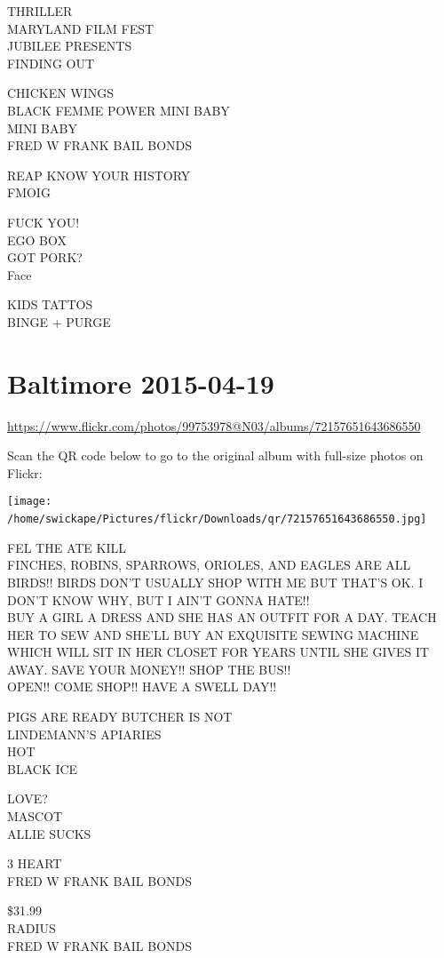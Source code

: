 \documentclass[10pt,letterpaper]{article}
\begin{document}
THRILLER\\
MARYLAND FILM FEST\\
JUBILEE PRESENTS\\
FINDING OUT

CHICKEN WINGS\\
BLACK FEMME POWER MINI BABY\\
MINI BABY\\
FRED W FRANK BAIL BONDS

REAP KNOW YOUR HISTORY\\
FMOIG

FUCK YOU!\\
EGO BOX\\
GOT PORK?\\
Face

KIDS TATTOS\\
BINGE + PURGE
\

\section*{Baltimore 2015-04-19}

\url{https://www.flickr.com/photos/99753978@N03/albums/72157651643686550}

Scan the QR code below to go to the original album with full-size photos on Flickr:

\texttt{[image: /home/swickape/Pictures/flickr/Downloads/qr/72157651643686550.jpg]}
\

FEL THE ATE KILL\\
FINCHES, ROBINS, SPARROWS, ORIOLES, AND EAGLES ARE ALL BIRDS!!  BIRDS DON'T USUALLY SHOP WITH ME BUT THAT'S OK.  I DON'T KNOW WHY, BUT I AIN'T GONNA HATE!!\\
BUY A GIRL A DRESS AND SHE HAS AN OUTFIT FOR A DAY.  TEACH HER TO SEW AND SHE'LL BUY AN EXQUISITE SEWING MACHINE WHICH WILL SIT IN HER CLOSET FOR YEARS UNTIL SHE GIVES IT AWAY.  SAVE YOUR MONEY!! SHOP THE BUS!!\\
OPEN!! COME SHOP!! HAVE A SWELL DAY!!

PIGS ARE READY BUTCHER IS NOT\\
LINDEMANN'S APIARIES\\
HOT\\
BLACK ICE

LOVE?\\
MASCOT\\
ALLIE SUCKS

3 HEART\\
FRED W FRANK BAIL BONDS

\$31.99\\
RADIUS\\
FRED W FRANK BAIL BONDS
\end{document}
